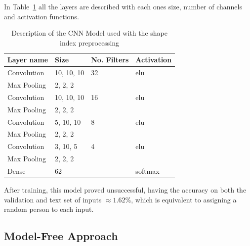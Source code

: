 \documentclass[12pt]{article}
\theoremstyle{definition}
\begin{document}
	In Table~\ref{table:preprocessing-CNN} all the layers are described with each ones size, number of channels and activation functions.

	\begin{table}[h]
		\centering
		\renewcommand{\arraystretch}{1.5}

		\caption{Description of the CNN Model used with the shape index preprocessing}
		\label{table:preprocessing-CNN}

		\begin{tabularx}{\textwidth}{XXXX}
			\textbf{Layer name} & \textbf{Size} & \textbf{No. Filters} & \textbf{Activation} \\ \hline
			Convolution & 10, 10, 10 & 32                   & elu                  \\ \hline
			Max Pooling & 2, 2, 2    & \textbf{\textendash} & \textbf{\textendash} \\ \hline
			Convolution & 10, 10, 10 & 16                   & elu                  \\ \hline
			Max Pooling & 2, 2, 2    & \textbf{\textendash} & \textbf{\textendash} \\ \hline
			Convolution & 5, 10, 10  & 8                    & elu                  \\ \hline
			Max Pooling & 2, 2, 2    & \textbf{\textendash} & \textbf{\textendash} \\ \hline
			Convolution & 3, 10, 5   & 4                    & elu                  \\ \hline
			Max Pooling & 2, 2, 2    & \textbf{\textendash} & \textbf{\textendash} \\ \hline
			Dense       & 62         & \textbf{\textendash} & softmax              \\
		\end{tabularx}
	\end{table}

	After training, this model proved unsuccessful, having the accuracy on both the validation and text set of inputs $\approx 1.62\%$, which is equivalent to assigning a random person to each input.

	\subsection{Model-Free Approach}
\end{document}
